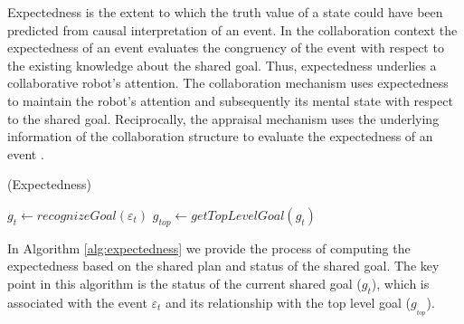 Expectedness is the extent to which the truth value of a state could have been
predicted from causal interpretation of an event. In the collaboration context
the expectedness of an event evaluates the congruency of the event with respect
to the existing knowledge about the shared goal. Thus, expectedness underlies a
collaborative robot's attention. The collaboration mechanism uses expectedness
to maintain the robot's attention and subsequently its mental state with respect
to the shared goal. Reciprocally, the appraisal mechanism uses the underlying
information of the collaboration structure to evaluate the expectedness of an
event \cite{shayganfar:appraisal-short}.

\begin{algorithm}[t]
	\caption{(Expectedness)}
	\label{alg:expectedness}
	\begin{algorithmic}[1]
			\Statex
			\State $\mathit{g}_{t} \gets \textit{recognizeGoal}{(\varepsilon_t)}$
			\State $\mathit{g}_{top} \gets \textit{getTopLevelGoal}{(\mathit{g}_{t})}$
			\Statex
				\State {}
				\Else
					\State {}
				\EndIf
			\Else
					\State {}
				\Else
					\State {}
				\EndIf
			\EndIf
		\EndFunction
	\end{algorithmic}
\end{algorithm}

In Algorithm \ref{alg:expectedness} we provide the process of computing the
expectedness based on the shared plan and status of the shared goal. The key
point in this algorithm is the status of the current shared goal
($\mathit{g}_{t}$), which is associated with the event $\varepsilon_t$ and its
relationship with the top level goal ($\mathit{g}_{_{top}}$).

